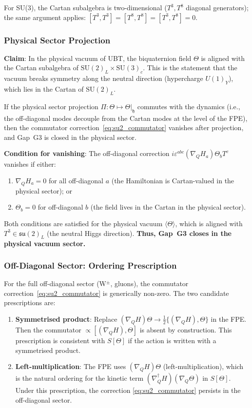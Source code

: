 \documentclass[12pt,a4paper]{article}
\theoremstyle{definition}
\theoremstyle{remark}
\begin{document}
For SU(3), the Cartan subalgebra is two-dimensional
($T^3, T^8$ diagonal generators); the same argument applies:
$[T^3, T^3] = [T^8, T^8] = [T^3, T^8] = 0$.

\subsubsection{Physical Sector Projection}

\textbf{Claim}: In the physical vacuum of UBT, the biquaternion field
$\Theta$ is aligned with the Cartan subalgebra of $\mathrm{SU}(2)_L \times
\mathrm{SU}(3)_c$.  This is the statement that the vacuum breaks symmetry
along the neutral direction (hypercharge $U(1)_Y$), which lies in the
Cartan of $\mathrm{SU}(2)_L$.

If the physical sector projection $\Pi:\Theta \mapsto \Theta|_{\mathfrak{h}}$
commutes with the dynamics (i.e., the off-diagonal modes decouple from the
Cartan modes at the level of the FPE), then the commutator
correction~\eqref{eq:su2_commutator} vanishes after projection, and
Gap~G3 is closed in the physical sector.

\textbf{Condition for vanishing}: The off-diagonal correction
$i\varepsilon^{abc}(\nabla_Q H_a)\Theta_b T^c$ vanishes if either:
\begin{enumerate}
  \item $\nabla_Q H_a = 0$ for all off-diagonal $a$ (the Hamiltonian
        is Cartan-valued in the physical sector); or
  \item $\Theta_b = 0$ for off-diagonal $b$ (the field lives in the
        Cartan in the physical sector).
\end{enumerate}

Both conditions are satisfied for the physical vacuum $\langle\Theta\rangle$,
which is aligned with $T^3 \in \mathfrak{su}(2)_L$ (the neutral Higgs
direction).  \textbf{Thus, Gap~G3 closes in the physical vacuum sector.}

\subsubsection{Off-Diagonal Sector: Ordering Prescription}

For the full off-diagonal sector (W$^\pm$, gluons), the commutator
correction~\eqref{eq:su2_commutator} is generically non-zero.  The
two candidate prescriptions are:
\begin{enumerate}
  \item \textbf{Symmetrised product}: Replace
        $(\nabla_Q H)\Theta \to \tfrac{1}{2}\{(\nabla_Q H), \Theta\}$
        in the FPE.  Then the commutator $\propto [(\nabla_Q H), \Theta]$
        is absent by construction.  This prescription is consistent with
        $S[\Theta]$ if the action is written with a symmetrised product.
  \item \textbf{Left-multiplication}: The FPE uses
        $(\nabla_Q H)\Theta$ (left-multiplication), which is the natural
        ordering for the kinetic term $(\nabla_Q^\dagger H)(\nabla_Q \Theta)$
        in $S[\Theta]$.  Under this prescription, the correction
        \eqref{eq:su2_commutator} persists in the off-diagonal sector.
\end{enumerate}
\end{document}
